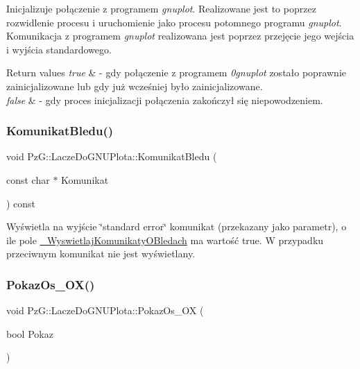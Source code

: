 Inicjalizuje połączenie z programem {\itshape gnuplot}. Realizowane jest to poprzez rozwidlenie procesu i uruchomienie jako procesu potomnego programu {\itshape gnuplot}. Komunikacja z programem {\itshape gnuplot} realizowana jest poprzez przejęcie jego wejścia i wyjścia standardowego.


\begin{DoxyRetVals}{Return values}
{\em true} & -\/ gdy połączenie z programem {\itshape 0gnuplot} zostało poprawnie zainicjalizowane lub gdy już wcześniej było zainicjalizowane. \\
\hline
{\em false} & -\/ gdy proces inicjalizacji połączenia zakończył się niepowodzeniem. \\
\hline
\end{DoxyRetVals}
\mbox{\label{classPzG_1_1LaczeDoGNUPlota_a90056743aeaa546721528005f2cf41e6}} 
\subsubsection{\texorpdfstring{Komunikat\+Bledu()}{KomunikatBledu()}}
{\footnotesize\ttfamily void Pz\+G\+::\+Lacze\+Do\+G\+N\+U\+Plota\+::\+Komunikat\+Bledu (\begin{DoxyParamCaption}\item[{const char $\ast$}]{Komunikat }\end{DoxyParamCaption}) const\hspace{0.3cm}{\ttfamily [protected]}}

Wyświetla na wyjście \char`\"{}standard error\char`\"{} komunikat (przekazany jako parametr), o ile pole \hyperlink{classPzG_1_1LaczeDoGNUPlota_a2f2800f14ebfe1caef0b4d30c410a7fe}{\+\_\+\+Wyswietlaj\+Komunikaty\+O\+Bledach} ma wartość {\ttfamily true}. W przypadku przeciwnym komunikat nie jest wyświetlany. \mbox{\label{classPzG_1_1LaczeDoGNUPlota_a11421d7c67deab6b7524cc492407e897}} 
\subsubsection{\texorpdfstring{Pokaz\+Os\+\_\+\+O\+X()}{PokazOs\_OX()}\hspace{0.1cm}{\footnotesize\ttfamily [1/2]}}
{\footnotesize\ttfamily void Pz\+G\+::\+Lacze\+Do\+G\+N\+U\+Plota\+::\+Pokaz\+Os\+\_\+\+OX (\begin{DoxyParamCaption}\item[{bool}]{Pokaz }\end{DoxyParamCaption})\hspace{0.3cm}{\ttfamily [inline]}}



